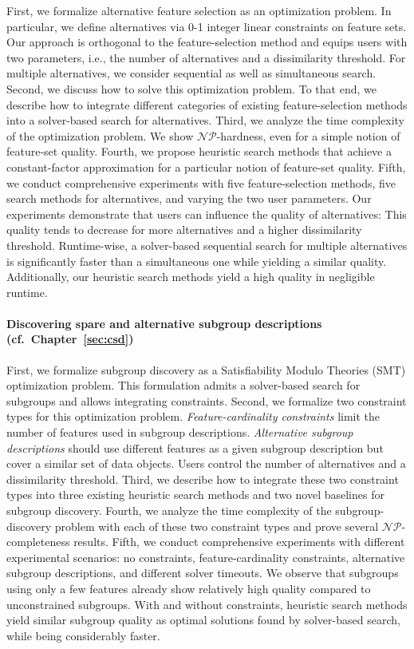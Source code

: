 First, we formalize alternative feature selection as an optimization problem.
In particular, we define alternatives via 0-1 integer linear constraints on feature sets.
Our approach is orthogonal to the feature-selection method and equips users with two parameters, i.e., the number of alternatives and a dissimilarity threshold.
For multiple alternatives, we consider sequential as well as simultaneous search.
Second, we discuss how to solve this optimization problem.
To that end, we describe how to integrate different categories of existing feature-selection methods into a solver-based search for alternatives.
Third, we analyze the time complexity of the optimization problem.
We show $\mathcal{NP}$-hardness, even for a simple notion of feature-set quality.
Fourth, we propose heuristic search methods that achieve a constant-factor approximation for a particular notion of feature-set quality.
Fifth, we conduct comprehensive experiments with five feature-selection methods, five search methods for alternatives, and varying the two user parameters.
Our experiments demonstrate that users can influence the quality of alternatives:
This quality tends to decrease for more alternatives and a higher dissimilarity threshold.
Runtime-wise, a solver-based sequential search for multiple alternatives is significantly faster than a simultaneous one while yielding a similar quality.
Additionally, our heuristic search methods yield a high quality in negligible runtime.

\paragraph{Discovering spare and alternative subgroup descriptions (cf.~Chapter~\ref{sec:csd})}

First, we formalize subgroup discovery as a Satisfiability Modulo Theories (SMT) optimization problem.
This formulation admits a solver-based search for subgroups and allows integrating constraints.
Second, we formalize two constraint types for this optimization problem.
\emph{Feature-cardinality constraints} limit the number of features used in subgroup descriptions.
\emph{Alternative subgroup descriptions} should use different features as a given subgroup description but cover a similar set of data objects.
Users control the number of alternatives and a dissimilarity threshold.
Third, we describe how to integrate these two constraint types into three existing heuristic search methods and two novel baselines for subgroup discovery.
Fourth, we analyze the time complexity of the subgroup-discovery problem with each of these two constraint types and prove several $\mathcal{NP}$-completeness results.
Fifth, we conduct comprehensive experiments with different experimental scenarios:
no constraints, feature-cardinality constraints, alternative subgroup descriptions, and different solver timeouts.
We observe that subgroups using only a few features already show relatively high quality compared to unconstrained subgroups.
With and without constraints, heuristic search methods yield similar subgroup quality as optimal solutions found by solver-based search, while being considerably faster.

